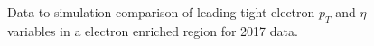 \begin{figure}[htbp]
    \begin{center}
        \caption{Data to simulation comparison of leading tight electron $p_T$ and $\eta$ variables in a electron enriched region for 2017 data.}
        \label{fig:obj_electron}
    \end{center}
  \end{figure}


